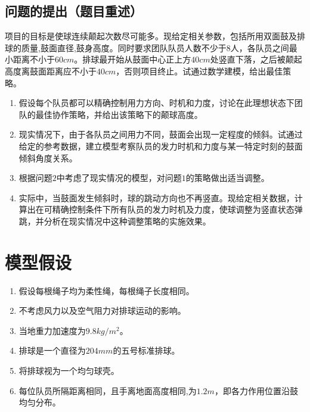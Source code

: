 \documentclass{cumcm}
\begin{document}
\subsection{问题的提出（题目重述）}
项目的目标是使球连续颠起次数尽可能多。现给定相关参数，包括所用双面鼓及排球的质量,鼓面直径,鼓身高度。同时要求团队队员人数不少于$8$人，各队员之间最小距离不小于$60cm$。排球最开始从鼓面中心正上方$40cm$处竖直下落，之后被颠起高度离鼓面距离应不小于$40cm$，否则项目终止。试通过数学建模，给出最佳策略。
\begin{enumerate}[(1)]
\item 假设每个队员都可以精确控制用力方向、时机和力度，讨论在此理想状态下团队的最佳协作策略，并给出该策略下的颠球高度。
\item 现实情况下，由于各队员之间用力不同，鼓面会出现一定程度的倾斜。试通过给定的参考数据，建立模型考察队员的发力时机和力度与某一特定时刻的鼓面倾斜角度关系。
\item 根据问题$2$中考虑了现实情况的模型，对问题$1$的策略做出适当调整。
\item 实际中，当鼓面发生倾斜时，球的跳动方向也不再竖直。现给定相关数据，计算出在可精确控制条件下所有队员的发力时机及力度，使球调整为竖直状态弹跳，并分析在现实情况中这种调整策略的实施效果。
\end{enumerate}

\section{模型假设}
\begin{enumerate}
\item 假设每根绳子均为柔性绳，每根绳子长度相同。
\item 不考虑风力以及空气阻力对排球运动的影响。
\item 当地重力加速度为$9.8kg/m^2$。
\item 排球是一个直径为$204mm$的五号标准排球。
\item 将排球视为一个均匀球壳。
\item 每位队员所隔距离相同，且手离地面高度相同,为$1.2m$，即各力作用位置沿鼓均匀分布。
\end{enumerate}
\end{document}
